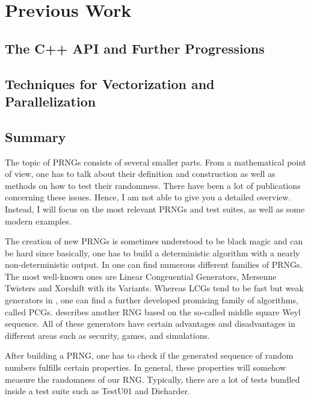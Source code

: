 \documentclass{stdlocal}
\begin{document}
\section{Previous Work} %
\label{sec:previous_work}
  \subsection{The C++ API and Further Progressions} %
  \label{sub:the_c_api_and_further_progressions}


  \subsection{Techniques for Vectorization and Parallelization} %
  \label{sub:techniques_for_vectorization_and_parallelization}


  \subsection{Summary} %
  \label{sub:summary}


  The topic of PRNGs consists of several smaller parts.
  From a mathematical point of view, one has to talk about their definition and construction as well as methods on how to test their randomness.
  There have been a lot of publications concerning these issues.
  Hence, I am not able to give you a detailed overview.
  Instead, I will focus on the most relevant PRNGs and test suites, as well as some modern examples.

  The creation of new PRNGs is sometimes understood to be black magic and can be hard since basically, one has to build a deterministic algorithm with a nearly non-deterministic output.
  In \textcite{kneusel2018} one can find numerous different families of PRNGs.
  The most well-known ones are Linear Congruential Generators, Mersenne Twisters and Xorshift with its Variants.
  Whereas LCGs tend to be fast but weak generators in \textcite{oneill2014}, one can find a further developed promising family of algorithms, called PCGs.
  \textcite{widynski2019} describes another RNG based on the so-called middle square Weyl sequence.
  All of these generators have certain advantages and disadvantages in different areas such as security, games, and simulations.

  After building a PRNG, one has to check if the generated sequence of random numbers fulfills certain properties.
  In general, these properties will somehow measure the randomness of our RNG.
  Typically, there are a lot of tests bundled inside a test suite such as TestU01 and Dieharder.
\end{document}
